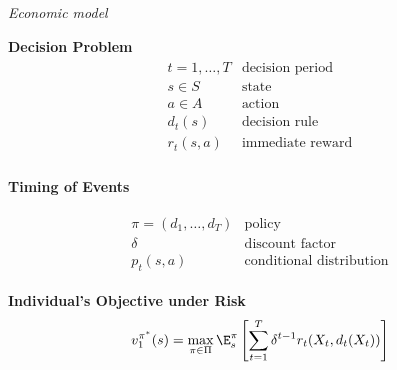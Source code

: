 \begin{frame}\begin{center}
		\LARGE\textit{Economic model}
\end{center}\end{frame}
\begin{frame}
\textbf{Decision Problem}
\begin{align*}\begin{array}{ll}
t = 1, \hdots, T& \text{decision period} \\
s\in S & \text{state}  \\
a\in A & \text{action} \\
d_t(s) & \text{decision rule} \\
r_t(s, a) & \text{immediate reward}\\
\end{array}\end{align*}
\end{frame}
\begin{frame}
\begin{center}\textbf{Timing of Events}\vspace{0.9cm}
\scalebox{0.9}{\hspace{-0.2cm}}
\end{center}
\end{frame}
\begin{frame}
\begin{align*}\begin{array}{ll}
\pi = (d_1, \hdots, d_T) & \text{policy}\\
\delta & \text{discount factor} \\
p_t(s, a) & \text{conditional distribution}
\end{array}\end{align*}
\end{frame}
\begin{frame}
\textbf{Individual's Objective under Risk}\vspace{0.3cm}
\begin{align*}
v^{\pi^*}_1(s) = \max_{\pi\in\Pi} \E_{s}^\pi\left[\sum^{T}_{t = 1}  \delta^{t - 1} r_t(X_t, d_t(X_t))\right]
\end{align*}
\end{frame}
